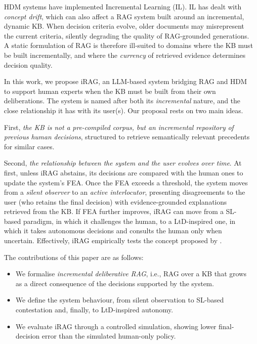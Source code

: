 \documentclass[a4paper,twoside]{article}
\begin{document}
HDM systems have implemented Incremental Learning (IL). IL has dealt with \textit{concept drift}, which can also affect a RAG system built around an incremental, dynamic KB. When decision criteria evolve, older documents may misrepresent the current criteria, silently degrading the quality of RAG-grounded generations.
A static formulation of RAG is therefore ill-suited to domains where the KB must be built incrementally, and where the \textit{currency} of retrieved evidence determines decision quality.

In this work, we propose iRAG, an LLM-based system bridging RAG and HDM to support human experts when the KB must be built from their own deliberations. The system is named after both its \textit{incremental} nature, and the close relationship it has with its user(s). Our proposal rests on two main ideas.

First, \textit{the KB is not a pre-compiled corpus, but an incremental repository of previous human decisions}, structured to retrieve semantically relevant precedents for similar cases.

Second, \textit{the relationship between the system and the user evolves over time}. At first, unless iRAG abstains, its decisions are compared with the human ones to update the system's FEA. Once the FEA exceeds a threshold, the system moves from a \textit{silent observer} to an \textit{active interlocutor}, presenting disagreements to the user (who retains the final decision) with evidence-grounded explanations retrieved from the KB. If FEA further improves, iRAG can move from a SL-based paradigm, in which it challenges the human, to a LtD-inspired one, in which it takes autonomous decisions and consults the human only when uncertain. Effectively, iRAG empirically tests the concept proposed by \cite{pellungrini2025bridging}.

The contributions of this paper are as follows:
\begin{itemize}
    \item We formalise \textit{incremental deliberative RAG}, i.e., RAG over a KB that grows as a direct consequence of the decisions supported by the system.
    \item We define the system behaviour, from silent observation to SL-based contestation and, finally, to LtD-inspired autonomy.
    \item We evaluate iRAG through a controlled simulation, showing lower final-decision error than the simulated human-only policy.
\end{itemize}
\end{document}
